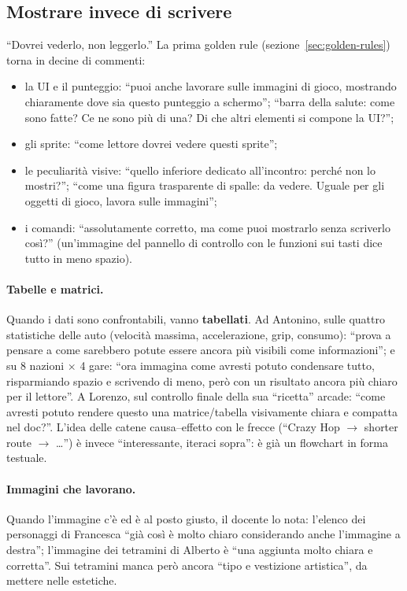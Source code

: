 \subsection{Mostrare invece di scrivere}
\label{rv:t1:sec:mostrare}

``Dovrei vederlo, non leggerlo.'' La prima golden rule
(sezione~\ref{sec:golden-rules}) torna in decine di commenti:
\begin{itemize}
  \item la UI e il punteggio: ``puoi anche lavorare sulle immagini di gioco,
        mostrando chiaramente dove sia questo punteggio a schermo'';
        ``barra della salute: come sono fatte? Ce ne sono più di una? Di che
        altri elementi si compone la UI?'';
  \item gli sprite: ``come lettore dovrei vedere questi sprite'';
  \item le peculiarità visive: ``quello inferiore dedicato all'incontro: perché
        non lo mostri?''; ``come una figura trasparente di spalle: da vedere.
        Uguale per gli oggetti di gioco, lavora sulle immagini'';
  \item i comandi: ``assolutamente corretto, ma come puoi mostrarlo senza
        scriverlo così?'' (un'immagine del pannello di controllo con le
        funzioni sui tasti dice tutto in meno spazio).
\end{itemize}

\paragraph{Tabelle e matrici.} Quando i dati sono confrontabili, vanno
\textbf{tabellati}. Ad Antonino, sulle quattro statistiche delle auto
(velocità massima, accelerazione, grip, consumo): ``prova a pensare a come
sarebbero potute essere ancora più visibili come informazioni''; e su 8
nazioni $\times$ 4 gare: ``ora immagina come avresti potuto condensare tutto,
risparmiando spazio e scrivendo di meno, però con un risultato ancora più
chiaro per il lettore''. A Lorenzo, sul controllo finale della sua ``ricetta''
arcade: ``come avresti potuto rendere questo una matrice/tabella visivamente
chiara e compatta nel doc?''. L'idea delle catene causa--effetto con le
frecce (``Crazy Hop $\rightarrow$ shorter route $\rightarrow$ \dots'') è invece
``interessante, iteraci sopra'': è già un flowchart in forma testuale.

\paragraph{Immagini che lavorano.} Quando l'immagine c'è ed è al posto
giusto, il docente lo nota: l'elenco dei personaggi di Francesca ``già così è
molto chiaro considerando anche l'immagine a destra''; l'immagine dei
tetramini di Alberto è ``una aggiunta molto chiara e corretta''. Sui tetramini
manca però ancora ``tipo e vestizione artistica'', da mettere nelle
estetiche.


